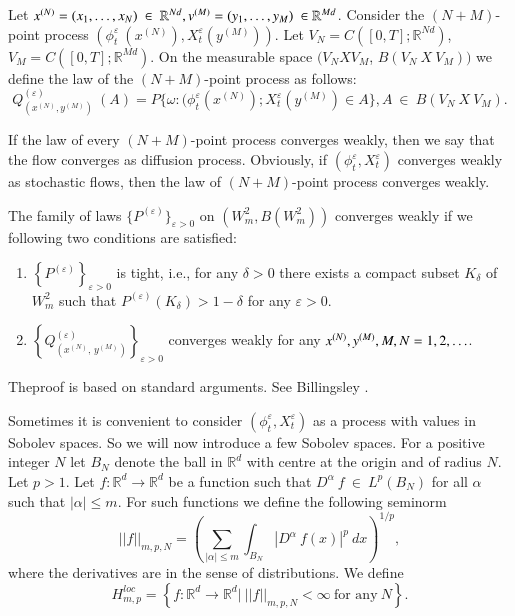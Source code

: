 \setcounter{definition}{3}
\begin{definition}\label{c3:def3.1.4}%
  Let $x^{(N)} = (x_1, \ldots, x_N) ~ \in ~ \mathbb{R}^{Nd},
  v^{(M)} = (y_1,\ldots,y_M) ~ \in \break
  \mathbb{R}^{Md}$. Consider the $(N+M)$-point process
  $(\phi_t^\varepsilon ~ (x^{(N)}), X^\varepsilon_t (y^{(M)}))$. Let
  $V_N = C([0,T]; \mathbb{R}^{Nd})$, $V_M =
  C([0,T];\mathbb{R}^{Md})$. On the measurable space $(V_N  X  V_M$,
  $B(V_N ~ X ~ V_M))$ we define the law of the $(N+M)$-point process as
  follows: 
$$
Q^{(\varepsilon)}_{(x^{(N)},y^{(M)})} ~ (A) = P \{ \omega: 
(\phi^\varepsilon_t (x^{(N)}) ; X^\varepsilon_t (y^{(M)}) \in
A \}, A ~ \in ~ B(V_N ~ X ~ V_M). 
$$
\end{definition}

If the law of every $(N+M)$-point process converges weakly, then we
say that the flow converges as diffusion process. Obviously, if
$(\phi^\varepsilon_t,X^\varepsilon_t)$ converges weakly as stochastic
flows, then the law of $(N+M)$-point process converges weakly. 

\setcounter{proposition}{4}
\begin{proposition}\label{c3:prop3.1.5}%
  The family of laws $\{ P^{(\varepsilon)} \}_{\varepsilon > 0} $ on
  $(W^2_m,B(W^2_m))$ converges weakly if we following two conditions
  are satisfied: 
  \begin{enumerate}[\rm (i)]
  \item $\left\{ P^{(\varepsilon)}\right\}_{\varepsilon > 0} $ is tight, i.e.,
    for any $\delta > 0$ there exists a compact subset $K_\delta$ of
    $W^2_m$ such that $P^{(\varepsilon)}(K_\delta) > 1 - \delta$ for
    any $\varepsilon > 0$. 

  \item $\left\{ Q^{(\varepsilon)}_{(x^{(N)}, \, y^{(M)})} \right\}_{\varepsilon >
    0}$ converges weakly for any $x^{(N)},y^{(M)},M,N =\break
    1,2,\ldots$.  
  \end{enumerate}
  The\pageoriginale proof is based on standard arguments.  See
    Billingsley \cite{2}. 
\end{proposition}

Sometimes it is convenient to consider
$(\phi^\varepsilon_t,X^\varepsilon_t)$ as a process with values in
Sobolev spaces. So we will now introduce a few Sobolev spaces.  For a
positive integer $N$ let $B_N$ denote the ball in $\mathbb{R}^d$ with
centre at the origin and of radius $N$. Let $p > 1$. Let $f:
\mathbb{R}^d \rightarrow \mathbb{R}^d$ be a function such that
$D^\alpha ~ f ~ \in ~ L^p (B_N)$ for all $\alpha$ such that
$|\alpha | \le m$. For such functions we define the following seminorm 
$$
|| f ||_{m,p,N} = \left(\sum_{|\alpha | \le m} \int_{B_N} | D^\alpha ~
f(x) |^p ~ dx\right)^{1/p}, 
$$
where the derivatives are in the sense of distributions. We define
$$
H^{loc}_{m,p} = \left\{ f:  \mathbb{R}^d \rightarrow \mathbb{R}^d | ~ || f
||_{m,p,N}  <   \infty ~\text{for any}~ N\right\}. 
$$

